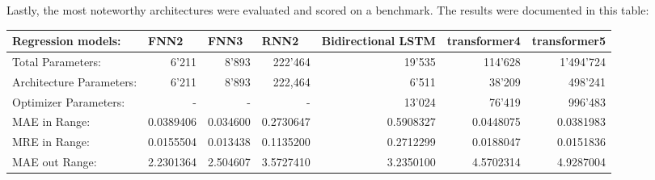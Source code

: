 \documentclass{article}
\begin{document}
Lastly, the most noteworthy architectures were evaluated and scored on a 
benchmark. The results were documented in this table: 
\\[0.5em]
\begin{table}[htbp]
\centering %
\footnotesize
\begin{tabular}{|lr|r|r|r|r|r|r|}
\hline
\multicolumn{2}{|l|}{Regression models:}                              & \multicolumn{1}{l|}{FNN2} & \multicolumn{1}{l|}{FNN3}        & \multicolumn{1}{l|}{RNN2} & \multicolumn{1}{l|}{Bidirectional   LSTM} & \multicolumn{1}{l|}{transformer4} & \multicolumn{1}{l|}{transformer5} \\ \hline
\multicolumn{2}{|l|}{Total   Parameters:}                             & 6’211                     & 8’893                            & 222’464                   & 19’535                                    & 114’628                           & 1’494’724                         \\
\multicolumn{2}{|l|}{Architecture   Parameters:}                      & 6’211                     & 8’893                            & 222,464                   & 6’511                                     & 38’209                            & 498’241                           \\
\multicolumn{2}{|l|}{Optimizer   Parameters:}                         & -                         & -                                & -                         & 13’024                                    & 76’419                            & 996’483                           \\
\rowcolor[HTML]{F7C7AC} 
MAE in Range:                              &                          & 0.0389406                 & 0.034600                         & 0.2730647                 & 0.5908327                                 & 0.0448075                         & 0.0381983                         \\
\rowcolor[HTML]{F7C7AC} 
MRE in Range:                              &                          & 0.0155504                 & 0.013438                         & 0.1135200                 & 0.2712299                                 & 0.0188047                         & 0.0151836                         \\
\rowcolor[HTML]{94DCF8} 
MAE out Range:                             &                          & 2.2301364                 & \cellcolor[HTML]{83CCEB}2.504607 & 3.5727410                 & 3.2350100                                 & 4.5702314                         & 4.9287004                         \\

\end{tabular}
\end{table}
\end{document}
